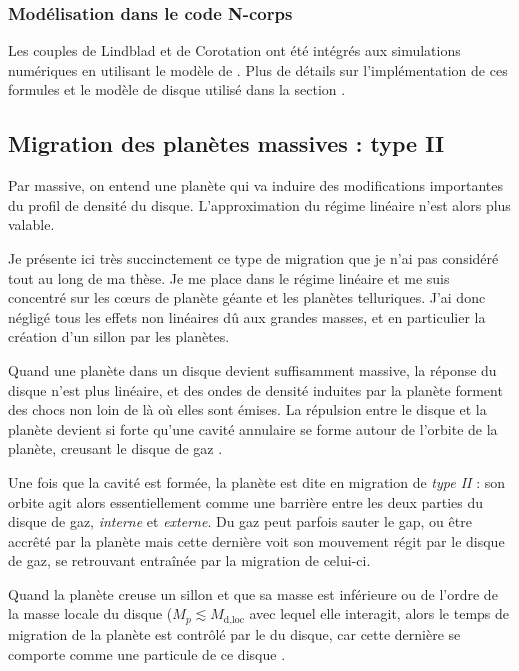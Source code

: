 \subsubsection{Modélisation dans le code N-corps}
Les couples de Lindblad et de Corotation ont été intégrés aux simulations numériques en utilisant le modèle de \cite{paardekooper2011torque}. Plus de détails sur l'implémentation de ces formules et le modèle de disque utilisé dans la section .

\subsection{Migration des planètes massives : type II}
Par massive, on entend une planète qui va induire des modifications importantes du profil de densité du disque. L'approximation du régime linéaire n'est alors plus valable. 

Je présente ici très succinctement ce type de migration que je n'ai pas considéré tout au long de ma thèse. Je me place dans le régime linéaire et me suis concentré sur les cœurs de planète géante et les planètes telluriques. J'ai donc négligé tous les effets non linéaires dû aux grandes masses, et en particulier la création d'un sillon par les planètes.

\bigskip

Quand une planète dans un disque devient suffisamment massive, la réponse du disque n'est plus linéaire, et des ondes de densité induites par la planète forment des chocs non loin de là où elles sont émises. La répulsion entre le disque et la planète devient si forte qu'une cavité annulaire se forme autour de l'orbite de la planète, creusant le disque de gaz \citep{lin1986tidal}.

Une fois que la cavité est formée, la planète est dite en migration de \emph{type II} : son orbite agit alors essentiellement comme une barrière entre les deux parties du disque de gaz, \emph{interne} et \emph{externe}. Du gaz peut parfois sauter le gap, ou être accrêté par la planète mais cette dernière voit son mouvement régit par le disque de gaz, se retrouvant entraînée par la migration de celui-ci.

Quand la planète creuse un sillon et que sa masse est inférieure ou de l'ordre de la masse locale du disque ($M_p \lesssim M_\text{d,loc}$ avec lequel elle interagit, alors le temps de migration de la planète est contrôlé par le  du disque, car cette dernière se comporte comme une particule de ce disque \citep{nelson2000migration}.


